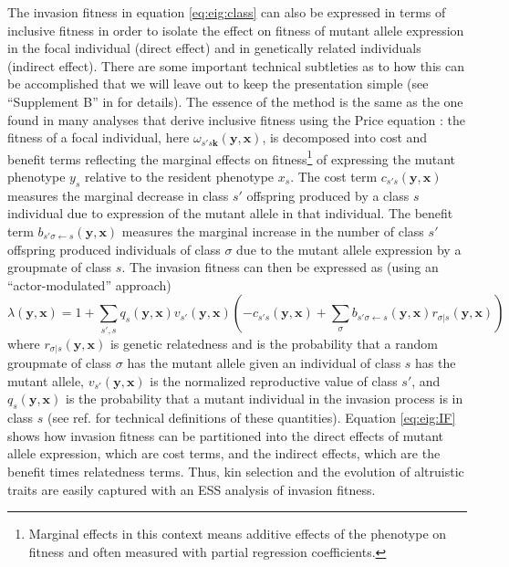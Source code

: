 \documentclass[11pt]{article}
\renewcommand{\vec}[1]{\symbf{#1}}
\newcommand{\eig}{\lambda}
\begin{document}
The invasion fitness in equation \eqref{eq:eig:class} can also be expressed in terms of inclusive fitness in order to isolate the effect on fitness of mutant allele expression in the focal individual (direct effect) and in genetically related individuals (indirect effect). There are some important technical subtleties as to how this can be accomplished that we will leave out to keep the presentation simple (see ``Supplement B'' in \cite{Lehmann:Rousset:2020} for details). The essence of the method is the same as the one found in many analyses that derive inclusive fitness using the Price equation \cite[e.g.,]{Queller:1992,Frank:1998,Lehmann:Keller:2006,Akcay:VanCleve:2012}: the fitness of a focal individual, here $\omega_{s's\vec{k}}(\vec{y}, \vec{x})$, is decomposed into cost and benefit terms reflecting the marginal effects on fitness\footnote{Marginal effects in this context means additive effects of the phenotype on fitness and often measured with partial regression coefficients.} of expressing the mutant phenotype $y_{s}$ relative to the resident phenotype $x_{s}$. The cost term $c_{s's}(\vec{y}, \vec{x})$ measures the marginal decrease in class $s'$ offspring produced by a class $s$ individual due to expression of the mutant allele in that individual. The benefit term $b_{s'\sigma \leftarrow s}(\vec{y}, \vec{x})$ measures the marginal increase in the number of class $s'$ offspring produced individuals of class $\sigma$ due to the mutant allele expression by a groupmate of class $s$. The invasion fitness can then be expressed as (using an ``actor-modulated'' approach) \cite{Lehmann:Rousset:2020}
\begin{equation}
  \label{eq:eig:IF}
  \eig(\vec{y}, \vec{x}) = 1 + \sum_{s',s} q_{s}(\vec{y}, \vec{x}) v_{s'}(\vec{y}, \vec{x})
  \left( - c_{s's}(\vec{y}, \vec{x}) + \sum_{\sigma} b_{s'\sigma \leftarrow s}(\vec{y}, \vec{x}) r_{\sigma|s}(\vec{y}, \vec{x}) \right)
\end{equation}
where $r_{\sigma|s}(\vec{y}, \vec{x})$ is genetic relatedness and is the probability that a random groupmate of class $\sigma$ has the mutant allele given an individual of class $s$ has the mutant allele, $v_{s'}(\vec{y}, \vec{x})$ is the normalized reproductive value of class $s'$, and $q_{s}(\vec{y}, \vec{x})$ is the probability that a mutant individual in the invasion process is in class $s$ (see ref. \cite{Lehmann:Rousset:2020} for technical definitions of these quantities). Equation \eqref{eq:eig:IF} shows how invasion fitness can be partitioned into the direct effects of mutant allele expression, which are cost terms, and the indirect effects, which are the benefit times relatedness terms. Thus, kin selection and the evolution of altruistic traits are easily captured with an ESS analysis of invasion fitness.
\end{document}
